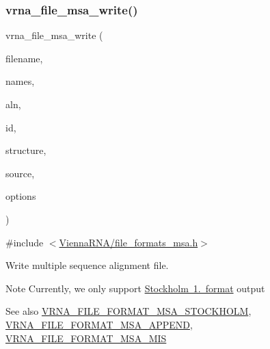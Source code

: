 \subsubsection{\texorpdfstring{vrna\+\_\+file\+\_\+msa\+\_\+write()}{vrna\_file\_msa\_write()}}
{\footnotesize\ttfamily vrna\+\_\+file\+\_\+msa\+\_\+write (\begin{DoxyParamCaption}\item[{const char $\ast$}]{filename,  }\item[{const char $\ast$$\ast$}]{names,  }\item[{const char $\ast$$\ast$}]{aln,  }\item[{const char $\ast$}]{id,  }\item[{const char $\ast$}]{structure,  }\item[{const char $\ast$}]{source,  }\item[{unsigned int}]{options }\end{DoxyParamCaption})}



{\ttfamily \#include $<$\mbox{\hyperlink{file__formats__msa_8h}{Vienna\+R\+N\+A/file\+\_\+formats\+\_\+msa.\+h}}$>$}



Write multiple sequence alignment file. 

\begin{DoxyNote}{Note}
Currently, we only support \mbox{\hyperlink{file_formats_msa-formats-stockholm}{Stockholm 1. format}} output
\end{DoxyNote}
\begin{DoxySeeAlso}{See also}
\mbox{\hyperlink{group__file__utils_ga62be992445cd8ab2ad7a8fded944338b}{V\+R\+N\+A\+\_\+\+F\+I\+L\+E\+\_\+\+F\+O\+R\+M\+A\+T\+\_\+\+M\+S\+A\+\_\+\+S\+T\+O\+C\+K\+H\+O\+LM}}, \mbox{\hyperlink{group__file__utils_ga1577ea0f497d9c501549c863a4f2c089}{V\+R\+N\+A\+\_\+\+F\+I\+L\+E\+\_\+\+F\+O\+R\+M\+A\+T\+\_\+\+M\+S\+A\+\_\+\+A\+P\+P\+E\+ND}}, \mbox{\hyperlink{group__file__utils_ga494488a771aa0c602fb4cf445be34d47}{V\+R\+N\+A\+\_\+\+F\+I\+L\+E\+\_\+\+F\+O\+R\+M\+A\+T\+\_\+\+M\+S\+A\+\_\+\+M\+IS}}
\end{DoxySeeAlso}

